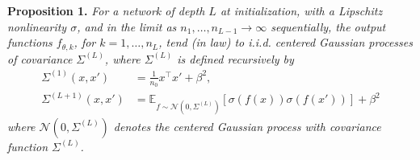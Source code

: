 \documentclass[10pt]{article}
\newcommand{\EE}{\mathbb{E}}
\newcommand{\NN}{\mathcal{N}}
\newcommand{\paran}[1]{{( #1 )}}
\begin{document}
\textbf{Proposition 1.} \textit{For a network of depth $L$ at initialization, with a Lipschitz nonlinearity $\sigma$, and in the limit as $n_1, \ldots, n_{L - 1} \rightarrow \infty$ sequentially, the output functions $f_{\theta,k}$, for $k = 1, \ldots, n_L$, tend (in law) to i.i.d. centered Gaussian processes of covariance $\Sigma^\paran{L}$, where $\Sigma^\paran{L}$ is defined recursively by
\begin{align*}
\Sigma^\paran{1}(x,x') &= \frac{1}{n_0} x^\top x' + \beta^2, \\
\Sigma^\paran{L + 1}(x,x') &= \EE_{f \sim \NN(0,\Sigma^\paran{L})} [\sigma(f(x)) \sigma(f(x'))] + \beta^2
\end{align*}
where $\NN(0,\Sigma^\paran{L})$ denotes the centered Gaussian process with covariance function $\Sigma^\paran{L}$.}
\end{document}

